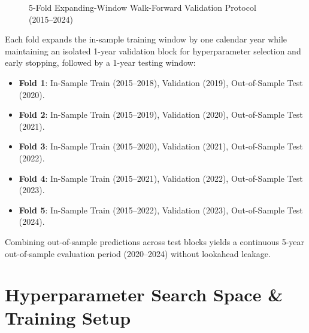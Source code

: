\begin{figure}[H]
{%
}
\caption{5-Fold Expanding-Window Walk-Forward Validation Protocol (2015--2024)}
\label{fig:ch4_walk_forward_scheme}
\end{figure}

Each fold expands the in-sample training window by one calendar year while maintaining an isolated 1-year validation block for hyperparameter selection and early stopping, followed by a 1-year testing window:
\begin{itemize}
    \item \textbf{Fold 1}: In-Sample Train (2015--2018), Validation (2019), Out-of-Sample Test (2020).
    \item \textbf{Fold 2}: In-Sample Train (2015--2019), Validation (2020), Out-of-Sample Test (2021).
    \item \textbf{Fold 3}: In-Sample Train (2015--2020), Validation (2021), Out-of-Sample Test (2022).
    \item \textbf{Fold 4}: In-Sample Train (2015--2021), Validation (2022), Out-of-Sample Test (2023).
    \item \textbf{Fold 5}: In-Sample Train (2015--2022), Validation (2023), Out-of-Sample Test (2024).
\end{itemize}

Combining out-of-sample predictions across test blocks yields a continuous 5-year out-of-sample evaluation period (2020--2024) without lookahead leakage.

\section{Hyperparameter Search Space \& Training Setup}
\label{sec:ch4_hyperparameters}

